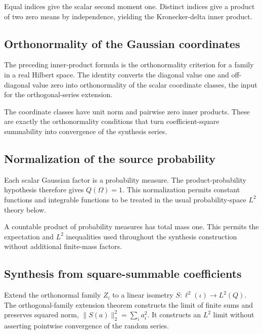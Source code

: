 \documentclass[11pt,a4paper]{report}
\begin{document}
Equal indices give the scalar second moment one. Distinct indices give a product of two zero means by independence, yielding the Kronecker-delta inner product.

\subsection{\texorpdfstring{Orthonormality of the Gaussian coordinates}{Orthonormality of the Gaussian coordinates}}
\label{report-step-UnadjustedLangevin-GaussianHilbert-lean-8}


The preceding inner-product formula is the orthonormality criterion for a family in a real Hilbert space. The identity converts the diagonal value one and off-diagonal value zero into orthonormality of the scalar coordinate classes, the input for the orthogonal-series extension.



The coordinate classes have unit norm and pairwise zero inner products. These are exactly the orthonormality conditions that turn coefficient-square summability into convergence of the synthesis series.

\subsection{\texorpdfstring{Normalization of the source probability}{Normalization of the source probability}}
\label{report-step-UnadjustedLangevin-GaussianHilbert-lean-9}


Each scalar Gaussian factor is a probability measure. The product-probability hypothesis therefore gives \(Q(\Omega)=1\). This normalization permits constant functions and integrable functions to be treated in the usual probability-space \(L^2\) theory below.



A countable product of probability measures has total mass one. This permits the expectation and \(L^2\) inequalities used throughout the synthesis construction without additional finite-mass factors.

\subsection{\texorpdfstring{Synthesis from square-summable coefficients}{Synthesis from square-summable coefficients}}
\label{report-step-UnadjustedLangevin-GaussianHilbert-lean-10}


Extend the orthonormal family \(Z_i\) to a linear isometry \(S:\ell^2(\iota)\to L^2(Q)\). The orthogonal-family extension theorem constructs the limit of finite sums and preserves squared norm, \(\|S(a)\|_2^2=\sum_i a_i^2\). It constructs an \(L^2\) limit without asserting pointwise convergence of the random series.
\end{document}

